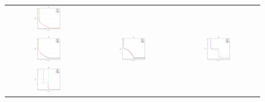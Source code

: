 \begin{figure}[h]
\begin{tabular}{ccc}
  \includegraphics[width=0.33\textwidth]{Surfaces/UF1.eps} 
  \\
  \includegraphics[width=0.33\textwidth]{Surfaces/UF2.eps} &
  \includegraphics[width=0.33\textwidth]{Surfaces/UF4.eps} &
  \includegraphics[width=0.33\textwidth]{Surfaces/UF5.eps}  
  \\
  \includegraphics[width=0.33\textwidth]{Surfaces/UF6.eps} &

\end{tabular}
\end{figure}
